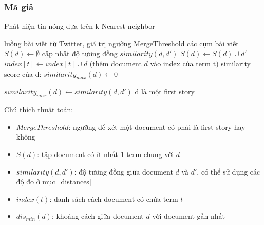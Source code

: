 	\subsubsection{Mã giả}
		\begin{algorithm}[H]
			\caption{Phát hiện tin nóng dựa trên k-Nearest neighbor}
			\begin{algorithmic}[1]
				\REQUIRE luồng bài viết từ Twitter, giá trị ngưỡng MergeThreshold
				\ENSURE các cụm bài viết
					\State $S(d) \leftarrow \emptyset$
							\State cập nhật độ tương đồng $similarity(d,d')$
							\State $S(d) \leftarrow S(d) \cup d'$
						\ENDFOR 
						\State $index[t] \leftarrow index[t] \cup d$ (thêm document $d$ vào index của term t)
					\ENDFOR
					\STATE similarity score của d: $similarity_{max}(d) \leftarrow 0$
					
							\STATE $similarity_{max}(d) \leftarrow similarity(d,d')$
						\ENDIF
					\ENDFOR
						\STATE d là một first story
					\ELSE
					
					\ENDIF
				\ENDFOR	
				
			\end{algorithmic}
		\end{algorithm}
		Chú thích thuật toán:
		\begin{itemize}
			\item $MergeThreshold$: ngưỡng để xét một document có phải là first story hay không
			\item $S(d)$: tập document có ít nhất 1 term chung với $d$
			\item $similarity(d,d')$: độ tương đồng giữa document $d$ và $d'$, có thể sử dụng các độ đo ở mục~\ref{distances}
			\item $index(t)$: danh sách cách document có chứa term $t$
			\item $dis_{min}(d)$: khoảng cách giữa document $d$ với document gần nhất
		\end{itemize}
		
